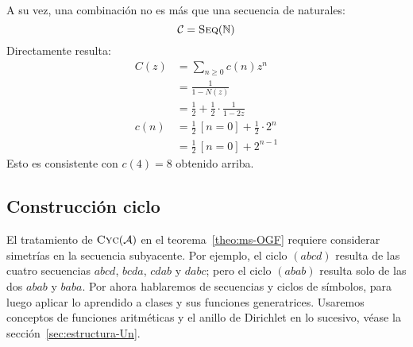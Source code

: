   A su vez,
  una combinación no es más que una secuencia de naturales:
  \begin{equation*}
    \mathcal{C}
      = \operatorname{\textsc{Seq}}(\mathbb{N})
  \end{equation*}
  Directamente resulta:
  \begin{align*}
    C(z)
      &= \sum_{n \ge 0} c(n) z^n \\
      &= \frac{1}{1 - N(z)} \\
      &= \frac{1}{2} + \frac{1}{2} \cdot \frac{1}{1 - 2 z} \\
    c(n)
      &= \frac{1}{2} \, [n = 0] + \frac{1}{2} \cdot 2^n \\
      &= \frac{1}{2} \, [n = 0] + 2^{n - 1}
  \end{align*}
  Esto es consistente con \(c(4) = 8\) obtenido arriba.



\subsection{Construcción ciclo}
\label{sec:ogf-ciclo}

  El tratamiento de \(\operatorname{\textsc{Cyc}}(\mathcal{A})\)
  en el teorema~\ref{theo:ms-OGF}
  requiere considerar simetrías en la secuencia subyacente.%
  Por ejemplo,
  el ciclo \((a b c d)\) resulta de las cuatro secuencias
  \(a b c d\), \(b c d a\), \(c d a b\) y \(d a b c\);
  pero el ciclo \((a b a b)\) resulta solo de las dos
  \(a b a b\) y \(b a b a\).
  Por ahora
  hablaremos de secuencias y ciclos de símbolos,
  para luego aplicar lo aprendido a clases
  y sus funciones generatrices.
  Usaremos conceptos de funciones aritméticas
  y el anillo de Dirichlet%
  en lo sucesivo,
  véase la sección~\ref{sec:estructura-Un}.

